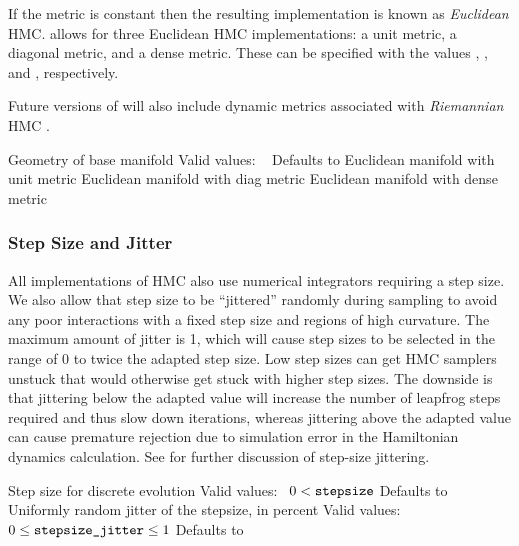 If the metric is constant then the resulting implementation is known
as \textit{Euclidean} HMC.  \Stan allows for three Euclidean HMC
implementations: a unit metric, a diagonal metric, and a dense
metric.  These can be specified with the values ,
, and , respectively.

Future versions of \Stan will also include dynamic metrics associated
with \textit{Riemannian} HMC \citep{GirolamiCalderhead:2011, Betancourt:2012}.
%
\begin{description}
          {Geometry of base manifold}
          {Valid values: \  }
          {Defaults to }
%
            {Euclidean manifold with unit metric}
%
            {Euclidean manifold with diag metric}
%
            {Euclidean manifold with dense metric}
\end{description}
%

\subsubsection{Step Size and Jitter}

All implementations of HMC also use numerical integrators requiring a
step size.  We also allow that step size to be ``jittered'' randomly
during sampling to avoid any poor interactions with a fixed step size
and regions of high curvature.  The maximum amount of jitter is 1,
which will cause step sizes to be selected in the range of 0 to twice
the adapted step size.  Low step sizes can get HMC samplers unstuck
that would otherwise get stuck with higher step sizes.  The downside
is that jittering below the adapted value will increase the number of
leapfrog steps required and thus slow down iterations, whereas
jittering above the adapted value can cause premature rejection due to
simulation error in the Hamiltonian dynamics calculation.  See
\citep{Neal:2011} for further discussion of step-size jittering.
%
\begin{description}
%
          {Step size for discrete evolution}
          {Valid values: \  $0 < \code{stepsize}$}
          {Defaults to }
%
          {Uniformly random jitter of the stepsize, in percent}
          {Valid values: \  $0 \leq \mbox{\code{stepsize\_jitter}} \leq 1$}
          {Defaults to }
\end{description}

